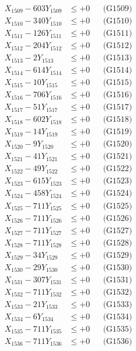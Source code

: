 \documentclass[a4paper,10pt]{article}
\begin{document}
{\begin{align}
X_{1509} - 603Y_{1509} &\leq +0 && \text{(G1509)} \\
X_{1510} - 340Y_{1510} &\leq +0 && \text{(G1510)} \\
\allowbreak
X_{1511} - 126Y_{1511} &\leq +0 && \text{(G1511)} \\
X_{1512} - 204Y_{1512} &\leq +0 && \text{(G1512)} \\
X_{1513} - 2Y_{1513} &\leq +0 && \text{(G1513)} \\
X_{1514} - 614Y_{1514} &\leq +0 && \text{(G1514)} \\
X_{1515} - 10Y_{1515} &\leq +0 && \text{(G1515)} \\
X_{1516} - 706Y_{1516} &\leq +0 && \text{(G1516)} \\
X_{1517} - 51Y_{1517} &\leq +0 && \text{(G1517)} \\
X_{1518} - 602Y_{1518} &\leq +0 && \text{(G1518)} \\
X_{1519} - 14Y_{1519} &\leq +0 && \text{(G1519)} \\
X_{1520} - 9Y_{1520} &\leq +0 && \text{(G1520)} \\
\allowbreak
X_{1521} - 41Y_{1521} &\leq +0 && \text{(G1521)} \\
X_{1522} - 49Y_{1522} &\leq +0 && \text{(G1522)} \\
X_{1523} - 615Y_{1523} &\leq +0 && \text{(G1523)} \\
X_{1524} - 458Y_{1524} &\leq +0 && \text{(G1524)} \\
X_{1525} - 711Y_{1525} &\leq +0 && \text{(G1525)} \\
X_{1526} - 711Y_{1526} &\leq +0 && \text{(G1526)} \\
X_{1527} - 711Y_{1527} &\leq +0 && \text{(G1527)} \\
X_{1528} - 711Y_{1528} &\leq +0 && \text{(G1528)} \\
X_{1529} - 34Y_{1529} &\leq +0 && \text{(G1529)} \\
X_{1530} - 29Y_{1530} &\leq +0 && \text{(G1530)} \\
\allowbreak
X_{1531} - 307Y_{1531} &\leq +0 && \text{(G1531)} \\
X_{1532} - 711Y_{1532} &\leq +0 && \text{(G1532)} \\
X_{1533} - 21Y_{1533} &\leq +0 && \text{(G1533)} \\
X_{1534} - 6Y_{1534} &\leq +0 && \text{(G1534)} \\
X_{1535} - 711Y_{1535} &\leq +0 && \text{(G1535)} \\
X_{1536} - 711Y_{1536} &\leq +0 && \text{(G1536)} \\

\end{align}}
\end{document}

